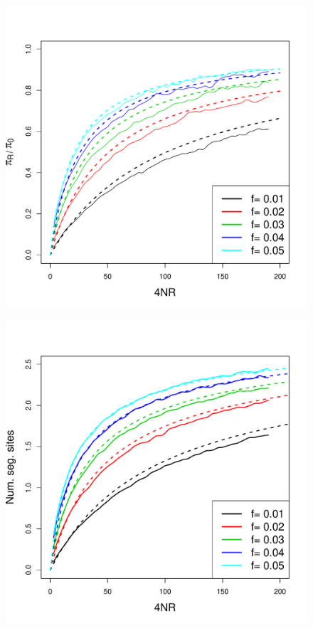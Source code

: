 \documentclass[a4paper,10pt]{article}
\begin{document}
\begin{figure}
\includegraphics[width = 0.8
          \textwidth]{Paper_Figures/pi_density.pdf}
\end{figure}

\begin{figure}
\includegraphics[width = 0.8
          \textwidth]{Paper_Figures/segsite_density.pdf}
\end{figure}
\end{document}
